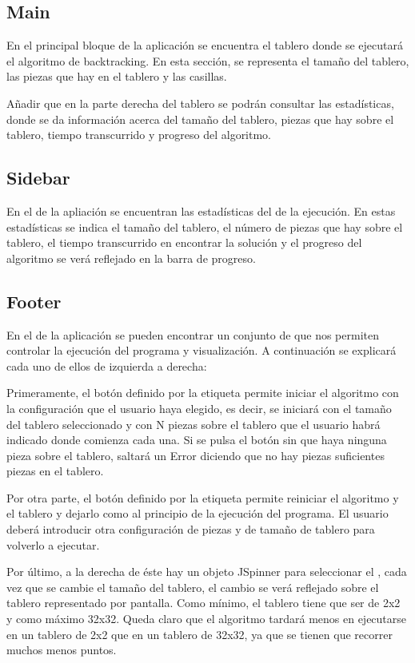 \subsection{Main}
En el principal bloque de la aplicación se encuentra el tablero donde se ejecutará el algoritmo de backtracking. En esta sección, se representa el tamaño del tablero, las piezas que hay en el tablero y las casillas. \bigskip

Añadir que en la parte derecha del tablero se podrán consultar las estadísticas, donde se da información acerca del tamaño del tablero, piezas que hay sobre el tablero, tiempo transcurrido y progreso del algoritmo. 

\subsection{Sidebar}
En el  de la apliación se encuentran las estadísticas del de la ejecución. En estas estadísticas se indica el tamaño del tablero, el número de piezas que hay sobre el tablero, el tiempo transcurrido en encontrar la solución y el progreso del algoritmo se verá reflejado en la barra de progreso.

\subsection{Footer}
En el  de la aplicación se pueden encontrar un conjunto de  que nos permiten controlar la ejecución del programa y visualización. A continuación se explicará cada uno de ellos de izquierda a derecha: \bigskip

Primeramente, el botón definido por la etiqueta  permite iniciar el algoritmo con la configuración que el usuario haya elegido, es decir, se iniciará con el tamaño del tablero seleccionado y con N piezas sobre el tablero que el usuario habrá indicado donde comienza cada una. Si se pulsa el botón  sin que haya ninguna pieza sobre el tablero, saltará un Error diciendo que no hay piezas suficientes piezas en el tablero.  \bigskip

Por otra parte, el botón definido por la etiqueta  permite reiniciar el algoritmo y el tablero y dejarlo como al principio de la ejecución del programa. El usuario deberá introducir otra configuración de piezas y de tamaño de tablero para volverlo a ejecutar.  \bigskip

Por último, a la derecha de éste hay un objeto JSpinner para seleccionar el , cada vez que se cambie el tamaño del tablero, el cambio se verá reflejado sobre el tablero representado por pantalla. Como mínimo, el tablero tiene que ser de 2x2 y como máximo 32x32. Queda claro que el algoritmo tardará menos en ejecutarse en un tablero de 2x2 que en un tablero de 32x32, ya que se tienen que recorrer muchos menos puntos.

